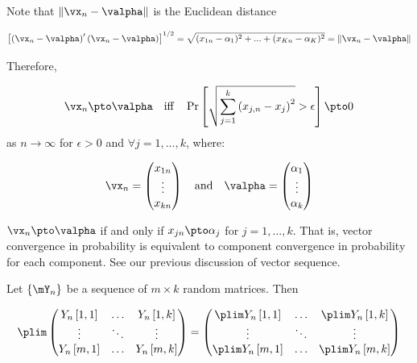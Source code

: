 \documentclass[english,12pt]{book}\usepackage[]{graphicx}\usepackage[]{xcolor}
\begin{document}
Note that $\left\| \vx_n - \valpha\right\| $ is the Euclidean distance 

\begin{equation*}
\left[\left(\vx_n - \valpha\right)'\left(\vx_n - \valpha\right)\right]^{1/2} = \sqrt{(x_{1n}-\alpha_1)^2 + ... + (x_{Kn} - \alpha_K)^2} = \left\| \vx_n - \valpha\right\| 
\end{equation*}

Therefore, 

\begin{equation*}
\vx_n \pto \valpha\quad \mbox{iff}\quad \Pr\left[\sqrt{\sum_{j = 1}^k\left(x_{j,n}- x_j\right)^2}> \epsilon\right]\pto 0
\end{equation*}
%
as $n\to \infty$ for $\epsilon >0$ and $\forall j = 1,...,k$, where:

\begin{equation*}
\vx_n = \begin{pmatrix}
          x_{1n} \\
          \vdots \\
          x_{kn}
        \end{pmatrix}
        \quad
        \mbox{and}
        \quad
\valpha = \begin{pmatrix}
            \alpha_1 \\
            \vdots \\
            \alpha_{k}
          \end{pmatrix}
\end{equation*}

\begin{remark}
  $\vx_n \pto \valpha$ if and only if $x_{jn}\pto \alpha_j$ for $j =1, ...,k$. That is, vector convergence in probability is equivalent to component convergence in probability for each component. See our previous discussion of vector sequence.
\end{remark}

\begin{definition}[Probability Limits of Matrices (and Vectors for $k = 1$)]
Let $\left\lbrace \mY_n \right\rbrace$ be a sequence of $m\times k$ random matrices. Then

\begin{equation*}
  \plim \begin{pmatrix}
          Y_n\left[1, 1\right] & \hdots & Y_n\left[1, k\right] \\
          \vdots & \ddots & \vdots \\
          Y_n\left[m, 1\right] & \hdots & Y_n\left[m, k\right]
        \end{pmatrix} = \begin{pmatrix}
          \plim Y_n\left[1, 1\right] & \hdots & \plim Y_n\left[1, k\right] \\
          \vdots & \ddots & \vdots \\
          \plim Y_n\left[m, 1\right] & \hdots & \plim Y_n\left[m, k\right]
        \end{pmatrix}
\end{equation*}
\end{definition}
\end{document}
